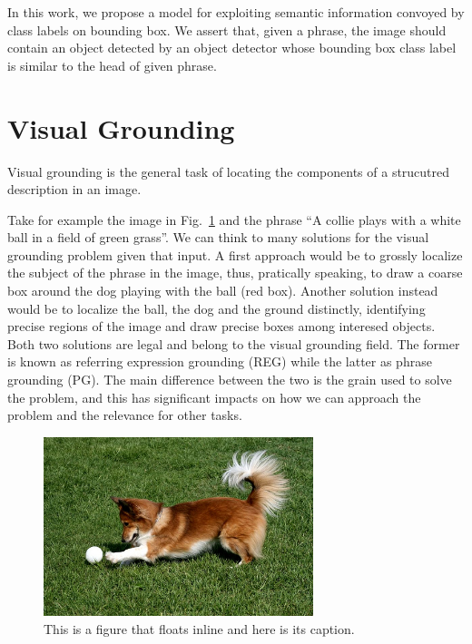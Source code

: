 In this work, we propose a model for exploiting semantic information
convoyed by class labels on bounding box. We assert that, given a
phrase, the image should contain an object detected by an object
detector whose bounding box class label is similar to the head of
given phrase. 

\section{Visual Grounding}

Visual grounding is the general task of locating the components of a strucutred description in an image. 

Take for example the image in Fig.~\ref{fig:dog-playing-with-ball} and
the phrase ``A collie plays with a white ball in a field of green
grass''. We can think to many solutions for the visual grounding
problem given that input. A first approach would be to grossly
localize the subject of the phrase in the image, thus, pratically
speaking, to draw a coarse box around the dog playing with the ball
(red box). Another solution instead would be to localize the ball, the
dog and the ground distinctly, identifying precise regions of the
image and draw precise boxes among interesed objects. Both two
solutions are legal and belong to the visual grounding field. The
former is known as referring expression grounding (REG) while the
latter as phrase grounding (PG). The main difference between the two
is the grain used to solve the problem, and this has significant
impacts on how we can approach the problem and the relevance for other
tasks.

\begin{figure}
    \centering
    \includegraphics[width=0.7\textwidth]{resources/dog-playing-with-ball.jpg}
    \caption[Short figure name.]{This is a figure that floats inline and here is its caption. 
    \label{fig:dog-playing-with-ball}}
\end{figure}

